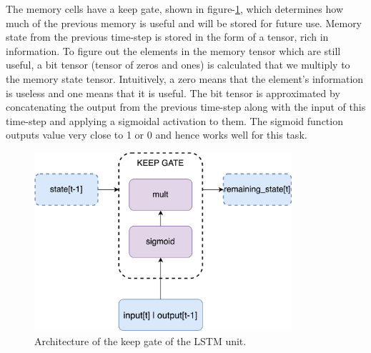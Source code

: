 The memory cells have a keep gate, shown in figure-\ref{fig:keep-gate}, which determines how much of the previous memory is useful and will be stored for future use. Memory state from the previous time-step is stored in the form of a tensor, rich in information. To figure out the elements in the memory tensor which are still useful, a bit tensor (tensor of zeros and ones) is calculated that we multiply to the memory state tensor. Intuitively, a zero means that the element's information is useless and one means that it is useful. The bit tensor is approximated by concatenating the output from the previous time-step along with the input of this time-step and applying a sigmoidal activation to them. The sigmoid function outputs value very close to 1 or 0 and hence works well for this task. 
\begin{figure}[!h]
	\centering
	\includegraphics[width=0.85\textwidth]{Pictures/keep-gate.png}
	\hspace{1mm}
	\caption{Architecture of the keep gate of the LSTM unit.} 
	\label{fig:keep-gate}
\end{figure}

